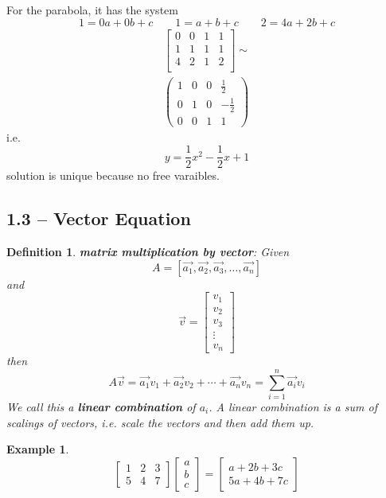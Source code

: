 \documentclass[11pt]{article}
\newtheorem{defn}{Definition}
\newtheorem{ex}{Example}
\begin{document}
For the parabola, it has the system
\[1 = 0a+0b+c \qquad 1 = a + b +c \qquad 2 = 4a + 2b + c\]
\begin{align*}
  \begin{bmatrix}
    0 & 0 & 1 & 1 \\
    1 & 1 & 1 & 1\\
    4 & 2 & 1 & 2 \\
  \end{bmatrix}
  \sim \\
\left(\begin{array}{rrrr}
1 & 0 & 0 & \frac{1}{2} \\
0 & 1 & 0 & -\frac{1}{2} \\
0 & 0 & 1 & 1
\end{array}\right)
\end{align*}
i.e.
\[y=\frac{1}{2}x^{2} - \frac{1}{2}x + 1\]
solution is unique because no free varaibles.
\subsection{1.3 -- Vector Equation}

\begin{defn}
  \textbf{matrix multiplication by vector}: Given
  \[A = [\vec{a_{1}}, \vec{a_{2}}, \vec{a_{3}}, \ldots, \vec{a_{n}}]\]
  and
  \[\vec{v} = \begin{bmatrix} v_{1} \\ v_{2} \\ v_{3} \\ \vdots \\ v_{n} \end{bmatrix}\]
  then
  \[A\vec{v} = \vec{a_{1}}v_{1}+\vec{a_{2}}v_{2} + \cdots + \vec{a_{n}}v_{n} = \sum_{i=1}^{n} \vec{a_{i}}v_{i}\]
  We call this a \textbf{linear combination} of $a_{i}$. A linear combination is a
  sum of scalings of vectors, i.e. scale the vectors and then add them up.
\end{defn}

\begin{ex}
  \[\begin{bmatrix} 1 & 2 & 3 \\ 5 & 4 & 7 \end{bmatrix} \begin{bmatrix} a \\ b \\ c \end{bmatrix} = \begin{bmatrix} a + 2b + 3c \\ 5a + 4b + 7c \end{bmatrix}\]
\end{ex}
\end{document}
